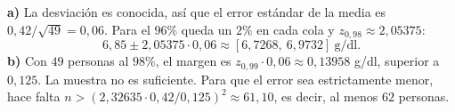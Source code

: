 \textbf{a)} La desviación es conocida, así que el error estándar de la media es $0{,}42/\sqrt{49}=0{,}06$. Para el $96\%$ queda un $2\%$ en cada cola y $z_{0{,}98}\approx2{,}05375$:
\[
6{,}85\pm 2{,}05375\cdot0{,}06
\approx\boxed{[6{,}7268,\ 6{,}9732]}\ \text{g/dl}.
\]
\textbf{b)} Con $49$ personas al $98\%$, el margen es $z_{0{,}99}\cdot0{,}06\approx0{,}13958$ g/dl, superior a $0{,}125$. La muestra no es suficiente. Para que el error sea estrictamente menor, hace falta
$n>(2{,}32635\cdot0{,}42/0{,}125)^2\approx61{,}10$, es decir, al menos $62$ personas.
